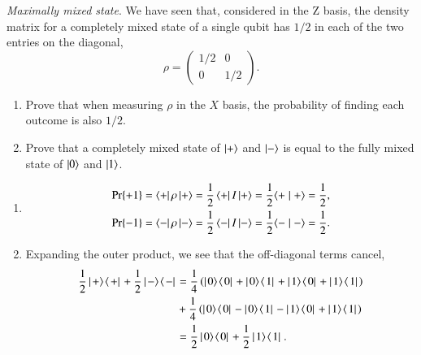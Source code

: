 \begin{exercise}
\emph{Maximally mixed state}. We have seen that, considered in the Z basis, the density matrix for a completely mixed state of a single qubit has $1/2$ in each of the two entries on the diagonal,
\begin{equation*}
    \rho=\left(\begin{array}{cc}
    1/2 & 0 \\
    0 & 1/2
    \end{array}\right).
\end{equation*}
\begin{enumerate}
    \item Prove that when measuring $\rho$ in the $X$ basis, the probability of finding each outcome is also $1/2$.
    \item Prove that a completely mixed state of $\left| + \right\rangle$ and $\left| - \right\rangle$ is equal to the fully mixed state of $\left| 0 \right\rangle$ and $\left| 1 \right\rangle$.
\end{enumerate}
\end{exercise}
\begin{solution}
\begin{enumerate}[label=(\alph*)]
    \item 
    \begin{align*}
        \text{Pr}\{+1\} & = \left\langle + \right| \rho \left| + \right\rangle = \frac{1}{2}\left\langle + \right| I \left| + \right\rangle = \frac{1}{2}\langle + \mid + \rangle = \frac{1}{2}, \\
        \text{Pr}\{-1\} & = \left\langle - \right| \rho \left| - \right\rangle = \frac{1}{2}\left\langle - \right| I \left| - \right\rangle = \frac{1}{2}\langle - \mid - \rangle = \frac{1}{2}.
    \end{align*}
    \item Expanding the outer product, we see that the off-diagonal terms cancel,
    \begin{align*}
        \frac{1}{2}\outp{+}{+} + \frac{1}{2}\outp{-}{-} & = \frac{1}{4} \left(\outp{0}{0}+\outp{0}{1}+\outp{1}{0}+\outp{1}{1}\right) \\
        & + \frac{1}{4} \left(\outp{0}{0}-\outp{0}{1}-\outp{1}{0}+\outp{1}{1}\right) \\
        & = \frac{1}{2}\outp{0}{0} + \frac{1}{2}\outp{1}{1}.
    \end{align*}    
\end{enumerate}
\end{solution}

